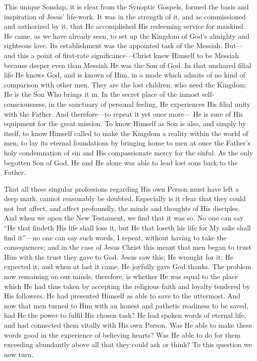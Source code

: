\documentclass[12pt,a5paper,oneside]{book}
\begin{document}
This unique Sonship, it is clear from the
Synoptic Gospels, formed the basis and inspiration 
of Jesus' life-work. It was in the
strength of it, and as commissioned and
authorized by it, that He accomplished His
redeeming service for mankind. He came, as we
have already seen, to set up the Kingdom of
God's almighty and righteous love. Its establishment 
was the appointed task of the Messiah.
But---and this a point of first-rate significance---Christ 
knew Himself to be Messiah because
deeper even than Messiah He was the Son of
God. In that unshared filial life He knows
God, and is known of Him, in a mode which
admits of no kind of comparison with other
men. They are the lost children, who need the
Kingdom; He is the Son Who brings it in.
In the secret place of the inmost self-consciousness, 
in the sanctuary of personal feeling, He
experiences His filial unity with the Father.
And therefore---to repeat it yet once more---
He is sure of His equipment for the great
mission. To know Himself as Son is also, and
simply by itself, to know Himself called to make
the Kingdom a reality within the world of men,
to lay its eternal foundations by bringing home
to men at once the Father's holy condemnation
of sin and His compassionate mercy for the
sinful. As the only begotten Son of God, He
and He alone was able to lead lost sons back
to the Father.

That all these singular professions regarding
His own Person must have left a deep mark,
cannot reasonably be doubted. Especially is
it clear that they could not but affect, and
affect profoundly, the minds and thoughts of
His disciples. And when we open the New
Testament, we find that it was so. No one
can say ``He that findeth His life shall
lose it, but He that loseth his life for My sake
shall find it''---no one can say such words, I
repeat, without having to take the consequences;
and in the case of Jesus Christ this meant that
men began to trust Him with the trust they
gave to God. Jesus saw this; He wrought for
it; He expected it; and when at last it came,
He joyfully gave God thanks. The problem
now remaining on our minds, therefore, is
whether He was equal to the place which He
had thus taken by accepting the religious faith
and loyalty tendered by His followers. He
had presented Himself as able to save to the
uttermost. And now that men turned to Him
with an honest and pathetic readiness to be
saved, had He the power to fulfil His chosen
task? He had spoken words of eternal life,
and had connected them vitally with His own
Person. Was He able to make these words
good in the experience of believing hearts?
Was He able to do for them exceeding abundantly 
above all that they could ask or think?
To this question we now turn.
\end{document}
